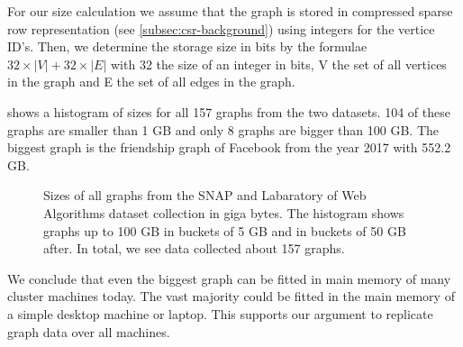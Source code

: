 For our size calculation we assume that the graph is stored in compressed sparse row representation (see \cref{subsec:csr-background}) using
integers for the vertice ID's.
Then, we determine the storage size in bits by the formulae $32 \times |V| + 32 \times |E|$ with 32 the size of an integer in bits, V the
set of all vertices in the graph and E the set of all edges in the graph.

 shows a histogram of sizes for all 157 graphs from the two datasets.
104 of these graphs are smaller than 1 GB and only 8 graphs are bigger than 100 GB.
The biggest graph is the friendship graph of Facebook from the year 2017 with 552.2 GB.

\begin{figure}
    \centering
    
    \caption{
      Sizes of all graphs from the SNAP and Labaratory of Web Algorithms dataset collection in giga bytes.
      The histogram shows graphs up to 100 GB in buckets of 5 GB and in buckets of 50 GB after.
      In total, we see data collected about 157 graphs.
    }
    \label{fig:graph-sizes}
\end{figure}

We conclude that even the biggest graph can be fitted in main memory of many cluster machines today.
The vast majority could be fitted in the main memory of a simple desktop machine or laptop.
This supports our argument to replicate graph data over all machines.



